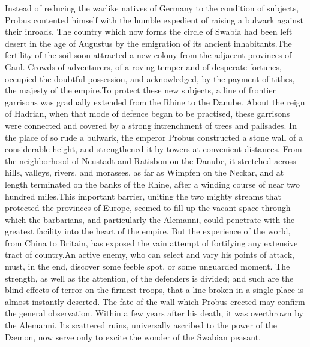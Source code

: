 Instead of reducing the warlike natives of Germany to the
condition of subjects, Probus contented himself with the humble
expedient of raising a bulwark against their inroads. The country
which now forms the circle of Swabia had been left desert in the
age of Augustus by the emigration of its ancient inhabitants.\footnotemark[41]
The fertility of the soil soon attracted a new colony from the
adjacent provinces of Gaul. Crowds of adventurers, of a roving
temper and of desperate fortunes, occupied the doubtful
possession, and acknowledged, by the payment of tithes, the
majesty of the empire.\footnotemark[42] To protect these new subjects, a line
of frontier garrisons was gradually extended from the Rhine to
the Danube. About the reign of Hadrian, when that mode of defence
began to be practised, these garrisons were connected and covered
by a strong intrenchment of trees and palisades. In the place of
so rude a bulwark, the emperor Probus constructed a stone wall of
a considerable height, and strengthened it by towers at
convenient distances. From the neighborhood of Neustadt and
Ratisbon on the Danube, it stretched across hills, valleys,
rivers, and morasses, as far as Wimpfen on the Neckar, and at
length terminated on the banks of the Rhine, after a winding
course of near two hundred miles.\footnotemark[43] This important barrier,
uniting the two mighty streams that protected the provinces of
Europe, seemed to fill up the vacant space through which the
barbarians, and particularly the Alemanni, could penetrate with
the greatest facility into the heart of the empire. But the
experience of the world, from China to Britain, has exposed the
vain attempt of fortifying any extensive tract of country.\footnotemark[44] An
active enemy, who can select and vary his points of attack, must,
in the end, discover some feeble spot, or some unguarded moment.
The strength, as well as the attention, of the defenders is
divided; and such are the blind effects of terror on the firmest
troops, that a line broken in a single place is almost instantly
deserted. The fate of the wall which Probus erected may confirm
the general observation. Within a few years after his death, it
was overthrown by the Alemanni. Its scattered ruins, universally
ascribed to the power of the Dæmon, now serve only to excite the
wonder of the Swabian peasant.


